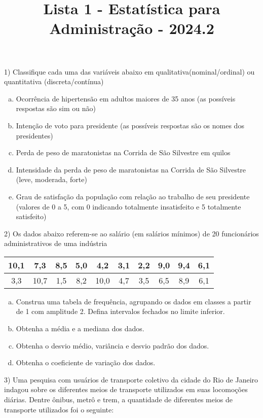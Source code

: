 \documentclass{article}
\title{Lista 1 - Estatística para Administração - 2024.2}
\begin{document}
\date{}
\maketitle

1) Classifique cada uma das variáveis abaixo em qualitativa(nominal/ordinal) ou quantitativa (discreta/contínua)

\begin{enumerate}[a)] %
\item Ocorrência de hipertensão em adultos maiores de 35 anos (as possíveis respostas são sim ou não)
\item Intenção de voto para presidente (as possíveis respostas são os nomes dos presidentes)
\item Perda de peso de maratonistas na Corrida de São Silvestre em quilos
\item Intensidade da perda de peso de maratonistas na Corrida de São Silvestre (leve, moderada, forte)
\item Grau de satisfação da população com relação ao trabalho de seu presidente (valores de 0 a 5, com 0 indicando totalmente insatisfeito e 5 totalmente satisfeito)
\end{enumerate}

2) Os dados abaixo referem-se ao salário (em salários mínimos) de 20 funcionários administrativos de uma indústria
\begin{table}[H]
\centering
\begin{tabular}{|c|c|c|c|c|c|c|c|c|c|}
\hline
10,1 & 7,3  & 8,5 & 5,0 & 4,2  & 3,1 & 2,2 & 9,0 & 9,4 & 6,1 \\ \hline
3,3  & 10,7 & 1,5 & 8,2 & 10,0 & 4,7 & 3,5 & 6,5 & 8,9 & 6,1 \\ \hline
\end{tabular}
\end{table}

\begin{enumerate}[a)]
\item Construa uma tabela de frequência, agrupando os dados em classes a partir de 1 com amplitude 2. Defina intervalos fechados no limite inferior.
\item Obtenha a média e a mediana dos dados.
\item Obtenha o desvio médio, variância e desvio padrão  dos dados.
\item Obtenha o coeficiente de variação dos dados.
\end{enumerate}

3) Uma pesquisa com usuários de transporte coletivo da cidade do Rio de Janeiro indagou sobre os diferentes meios de transporte utilizados em suas locomoções diárias. Dentre ônibus, metrô e trem, a quantidade de diferentes meios de transporte utilizados foi o seguinte:
\end{document}
